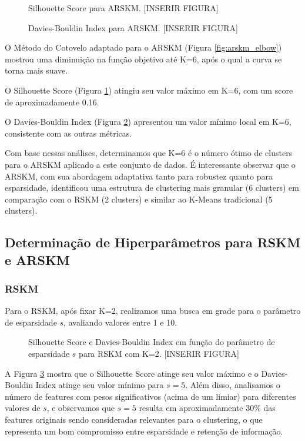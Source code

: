 \documentclass[conference]{IEEEtran}
\begin{document}
\begin{figure}[!t]
\centering
\caption{Silhouette Score para ARSKM. [INSERIR FIGURA]}
\label{fig:arskm_silhouette}
\end{figure}

\begin{figure}[!t]
\centering
\caption{Davies-Bouldin Index para ARSKM. [INSERIR FIGURA]}
\label{fig:arskm_dbi}
\end{figure}

O Método do Cotovelo adaptado para o ARSKM (Figura \ref{fig:arskm_elbow}) mostrou uma diminuição na função objetivo até K=6, após o qual a curva se torna mais suave.

O Silhouette Score (Figura \ref{fig:arskm_silhouette}) atingiu seu valor máximo em K=6, com um score de aproximadamente 0.16.

O Davies-Bouldin Index (Figura \ref{fig:arskm_dbi}) apresentou um valor mínimo local em K=6, consistente com as outras métricas.

Com base nessas análises, determinamos que K=6 é o número ótimo de clusters para o ARSKM aplicado a este conjunto de dados. É interessante observar que o ARSKM, com sua abordagem adaptativa tanto para robustez quanto para esparsidade, identificou uma estrutura de clustering mais granular (6 clusters) em comparação com o RSKM (2 clusters) e similar ao K-Means tradicional (5 clusters).

\subsection{Determinação de Hiperparâmetros para RSKM e ARSKM}
\subsubsection{RSKM}
Para o RSKM, após fixar K=2, realizamos uma busca em grade para o parâmetro de esparsidade $s$, avaliando valores entre 1 e 10.

\begin{figure}[!t]
\centering
\caption{Silhouette Score e Davies-Bouldin Index em função do parâmetro de esparsidade $s$ para RSKM com K=2. [INSERIR FIGURA]}
\label{fig:rskm_s_grid}
\end{figure}

A Figura \ref{fig:rskm_s_grid} mostra que o Silhouette Score atinge seu valor máximo e o Davies-Bouldin Index atinge seu valor mínimo para $s=5$. Além disso, analisamos o número de features com pesos significativos (acima de um limiar) para diferentes valores de $s$, e observamos que $s=5$ resulta em aproximadamente 30\% das features originais sendo consideradas relevantes para o clustering, o que representa um bom compromisso entre esparsidade e retenção de informação.
\end{document}
